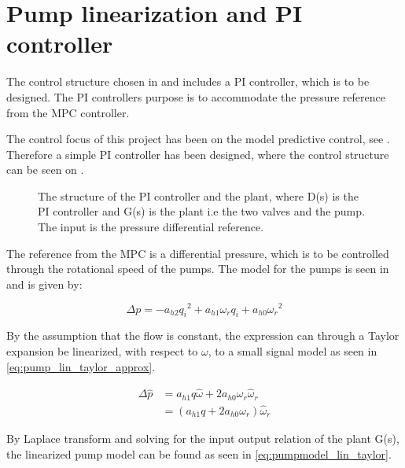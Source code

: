 \chapter{Pump linearization and PI controller}
\label{cha:linear_pump2}

The control structure chosen in  and  includes a PI controller, which is to be designed. The PI controllers purpose is to accommodate the pressure reference from the MPC controller. 

The control focus of this project has been on the model predictive control, see . Therefore a simple PI controller has been designed, where the control structure can be seen on .

\begin{figure}[H]
\centering
  
\caption{The structure of the PI controller and the plant, where D(s) is the PI controller and G(s) is the plant i.e the two valves and the pump. The input is the pressure differential reference.}
\label{fig:simple_PI}
\end{figure}

The reference from the MPC is a differential pressure, which is to be controlled through the rotational speed of the pumps. The model for the pumps is seen in  and is given by:

\begin{equation*}
\Delta p = -a_{h2}{q_i}^2 + a_{h1} \omega_r q_i + a_{h0}{\omega_r}^2
\end{equation*}

By the assumption that the flow is constant, the expression can through a Taylor expansion be linearized, with respect to $\omega$, to a small signal model as seen in \eqref{eq:pump_lin_taylor_approx}.


\begin{equation}
	\begin{split}
		\Delta \hat{p} &= a_{h1}q\hat{\omega} + 2a_{h0}{\omega_r}\hat{\omega}_r\\
					   &= (a_{h1}q + 2a_{h0}{\omega_r}) \hat{\omega}_r
	\end{split}
	\label{eq:pump_lin_taylor_approx}
\end{equation}

By Laplace transform and solving for the input output relation of the plant G(s), the linearized pump model can be found as seen in \eqref{eq:pumpmodel_lin_taylor}.

